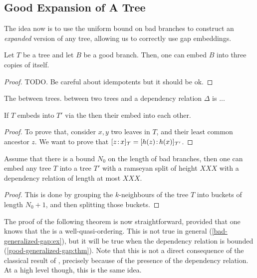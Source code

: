 \subsection{Good Expansion of A Tree}

The idea now is to use the uniform bound on bad branches to construct an
\emph{expanded} version of any tree, allowing us to correctly use gap
embeddings.

\begin{lemma}
    Let $T$ be a tree and let $B$ be a good branch. Then, one can embed     
    $B$ into three copies of itself.
\end{lemma}
\begin{proof}
    TODO. Be careful about idempotents but it should be ok.
\end{proof}

\begin{definition}
    The 
    between trees.
    between two trees and a dependency relation $\Delta$
    is ...
\end{definition}

\begin{lemma}
    If $T$ embeds into $T'$ via the 
    then their  embed into each other.
\end{lemma}
\begin{proof}
    To prove that, consider $x,y$ two leaves
    in $T$, and their least common ancestor $z$.
    We want to prove that
    $\tlbl{\t}{z}{x} = \tlbl{\t'}{h(z)}{h(x)}$.
\end{proof}

\begin{lemma}
    Assume that there is a bound $N_0$ on the length of bad branches, then
    one can embed any tree $T$ into a tree $T'$ with a ramseyan split of height $XXX$
    with a dependency relation of length at most $XXX$.
\end{lemma}
\begin{proof}
    This is done by grouping the $k$-neighbours of the tree $T$ into buckets of length $N_0 + 1$, and then
    splitting those buckets. 
\end{proof}

The proof of the following theorem is now straightforward, provided that one
knows that the  is a
well-quasi-ordering. This is not true in general
(\cref{bad-generalized-gap:ex}), but it will be true when the
dependency relation is bounded (\cref{good-generalized-gap:thm}).
Note that this is not a direct consequence of the classical result of
\cite{DERSHOWITZ200380}, precisely because of the presence of the dependency
relation. At a high level though, this is the same idea.


